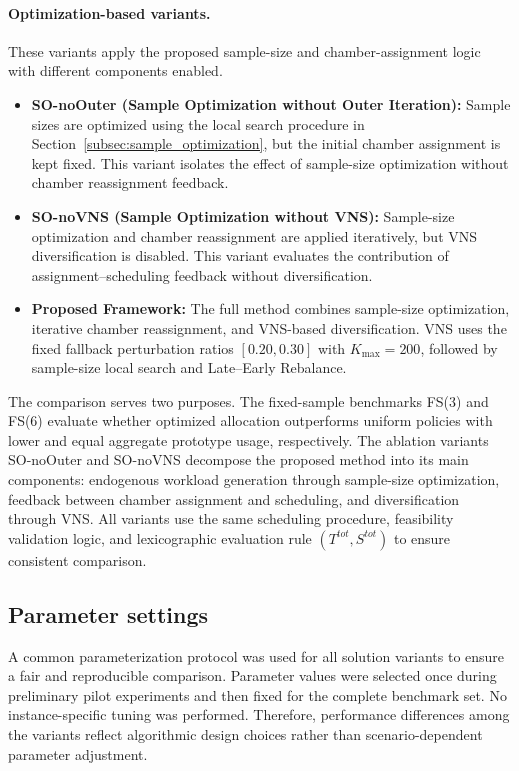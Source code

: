 \documentclass[11pt]{article}
\begin{document}
\paragraph{Optimization-based variants.}
These variants apply the proposed sample-size and chamber-assignment logic with different components enabled.

\begin{itemize}
    \item \textbf{SO-noOuter (Sample Optimization without Outer Iteration):}
    Sample sizes are optimized using the local search procedure in Section~\ref{subsec:sample_optimization}, but the initial chamber assignment is kept fixed. This variant isolates the effect of sample-size optimization without chamber reassignment feedback.

    \item \textbf{SO-noVNS (Sample Optimization without VNS):}
    Sample-size optimization and chamber reassignment are applied iteratively, but VNS diversification is disabled. This variant evaluates the contribution of assignment--scheduling feedback without diversification.

    \item \textbf{Proposed Framework:}
    The full method combines sample-size optimization, iterative chamber reassignment, and VNS-based diversification. VNS uses the fixed fallback perturbation ratios \([0.20,0.30]\) with \(K_{\max}=200\), followed by sample-size local search and Late--Early Rebalance.
\end{itemize}

The comparison serves two purposes. The fixed-sample benchmarks FS(3) and FS(6) evaluate whether optimized allocation outperforms uniform policies with lower and equal aggregate prototype usage, respectively. The ablation variants SO-noOuter and SO-noVNS decompose the proposed method into its main components: endogenous workload generation through sample-size optimization, feedback between chamber assignment and scheduling, and diversification through VNS. All variants use the same scheduling procedure, feasibility validation logic, and lexicographic evaluation rule \((T^{tot},S^{tot})\) to ensure consistent comparison.
\subsection{Parameter settings}
\label{subsec:parameter_settings}

A common parameterization protocol was used for all solution variants to ensure a fair and reproducible comparison. Parameter values were selected once during preliminary pilot experiments and then fixed for the complete benchmark set. No instance-specific tuning was performed. Therefore, performance differences among the variants reflect algorithmic design choices rather than scenario-dependent parameter adjustment.
\end{document}
